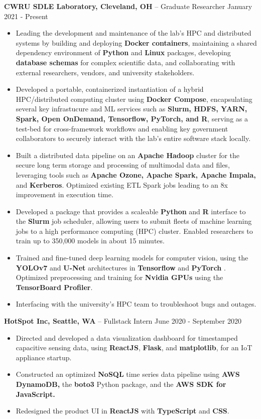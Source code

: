 \documentclass{res}
\begin{document}
\begin{resume}
{\large{\bf CWRU SDLE Laboratory, Cleveland, OH} – Graduate Researcher \hfill January 2021 - Present}
\begin{itemize} \itemsep -2pt
	\item Leading the development and maintenance of the lab's HPC and distributed systems by building and deploying \textbf{Docker containers}, maintaining a shared dependency environment of \textbf{Python} and \textbf{Linux} packages, developing \textbf{database schemas} for complex scientific data, and collaborating with external researchers, vendors, and university stakeholders.
	\item Developed a portable, containerized instantiation of a hybrid HPC/distributed computing cluster using \textbf{Docker Compose}, encapsulating several key infrastucure and ML services such as \textbf{Slurm, HDFS, YARN, Spark, Open OnDemand, Tensorflow, PyTorch, and R}, serving as a test-bed for cross-framework workflows and enabling key government collaborators to securely interact with the lab's entire software stack locally.
	\item Built a distributed data pipeline on an \textbf{Apache Hadoop} cluster for the secure long term storage and processing of multimodal data and files, leveraging tools such as \textbf{Apache Ozone, Apache Spark, Apache Impala,} and \textbf{Kerberos}. Optimized existing ETL Spark jobs leading to an 8x improvement in execution time.
	\item Developed a package that provides a scaleable \textbf{Python} and \textbf{R} interface to the \textbf{Slurm} job scheduler, allowing users to submit fleets of machine learning jobs to a high performance computing (HPC) cluster. Enabled researchers to train up to 350,000 models in about 15 minutes.
	\item Trained and fine-tuned deep learning models for computer vision, using the \textbf{YOLOv7} and \textbf{U-Net} architectures in \textbf{Tensorflow} and \textbf{PyTorch} . Optimized preprocessing and training for \textbf{Nvidia GPUs} using the \textbf{TensorBoard Profiler}.
	\item Interfacing with the university's HPC team to troubleshoot bugs and outages.
\end{itemize}


 {\large{\bf HotSpot Inc, Seattle, WA} – Fullstack Intern   \hfill June 2020 - September 2020}
 \begin{itemize} \itemsep -2pt  %
 \item Directed and developed a data visualization dashboard for timestamped capacitive sensing data, using \textbf{ReactJS}, \textbf{Flask}, and \textbf{matplotlib}, for an IoT appliance startup.
 \item Constructed an optimized \textbf{NoSQL} time series data pipeline using \textbf{AWS DynamoDB,} the \textbf{boto3} Python package, and the \textbf{AWS SDK for JavaScript.}
 \item Redesigned the product UI in \textbf{ReactJS} with \textbf{TypeScript} and \textbf{CSS}.
 \end{itemize}


\end{resume}
\end{document}
